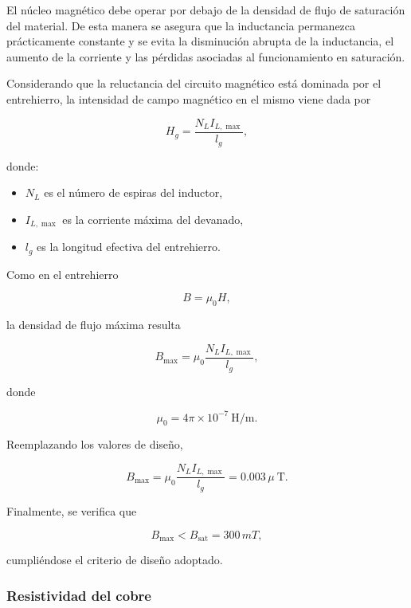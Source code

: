 \documentclass[]{article}
\begin{document}
	El núcleo magnético debe operar por debajo de la densidad de flujo de saturación del material. De esta manera se asegura que la inductancia permanezca prácticamente constante y se evita la disminución abrupta de la inductancia, el aumento de la corriente y las pérdidas asociadas al funcionamiento en saturación.
	
	
	
	Considerando que la reluctancia del circuito magnético está dominada por el entrehierro, la intensidad de campo magnético en el mismo viene dada por
	
	\begin{equation}
		H_g=\frac{N_LI_{L,\max}}{l_g},
		\label{eq:H_gap}
	\end{equation}
	
	donde:
	
	\begin{itemize}
		\item $N_L$ es el número de espiras del inductor,
		\item $I_{L,\max}$ es la corriente máxima del devanado,
		\item $l_g$ es la longitud efectiva del entrehierro.
	\end{itemize}
	
	Como en el entrehierro
	
	\[
	B=\mu_0H,
	\]
	
	la densidad de flujo máxima resulta
	
	\begin{equation}
		B_{\max}
		=
		\mu_0
		\frac{N_LI_{L,\max}}{l_g},
		\label{eq:Bmax_gap}
	\end{equation}
	
	donde
	
	\[
	\mu_0=4\pi\times10^{-7}\ \mathrm{H/m}.
	\]
	
	Reemplazando los valores de diseño,
	
	\[
	B_{\max}
	=
	\mu_0
	\frac{N_LI_{L,\max}}{l_g}
	= 0.003 \, \mu
	\ \mathrm{T}.
	\]
	
	Finalmente, se verifica que
	
	\begin{equation}
		B_{\max}
		<
		B_{\mathrm{sat}} = 300 \, mT,
	\end{equation}
	
	cumpliéndose el criterio de diseño adoptado.
\subsubsection{Resistividad del cobre}
\end{document}
